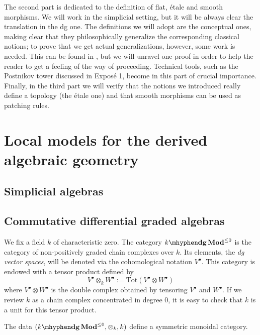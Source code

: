 \begin{refsection}
The second part is dedicated to the definition of flat, \'etale and smooth morphisms. We will work in the simplicial setting, but it will be always clear the translation in the dg one. The definitions we will adopt are the conceptual ones, making clear that they philosophically generalize the corresponding classical notions; to prove that we get actual generalizations, however, some work is needed. This can be found in \cite[Chapter 2.2]{hagII}, but we will unravel one proof in order to help the reader to get a feeling of the way of proceeding. Technical tools, such as the Postnikov tower discussed in Expos\'e 1, become in this part of crucial importance. Finally, in the third part we will verify that the notions we introduced really define a topology (the \'etale one) and that smooth morphisms can be used as patching rules.

\section{Local models for the derived algebraic geometry}

\subsection{Simplicial algebras}

\subsection{Commutative differential graded algebras}

We fix a field $k$ of characteristic zero. The category $\dgMod{k}^{\le 0}$ is the category of non-positively graded chain complexes over $k$. Its elements, the \emph{dg vector spaces}, will be denoted via the cohomological notation $V^\bullet$. This category is endowed with a tensor product defined by
\[
V^\bullet \otimes_k W^\bullet := \mathrm{Tot}(V^\bullet \otimes W^\bullet)
\]
where $V^\bullet \otimes W^\bullet$ is the double complex obtained by tensoring $V^\bullet$ and $W^\bullet$. If  we review $k$ as a chain complex concentrated in degree $0$, it is easy to check that $k$ is a unit for this tensor product.

\begin{exercise}
The data $(\dgMod{k}^{\le 0}, \otimes_k, k)$ define a symmetric monoidal category.
\end{exercise}



\end{refsection}
